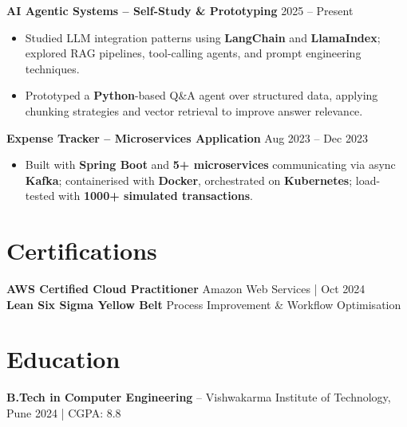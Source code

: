 \documentclass[letterpaper,10pt]{article}
\begin{document}
\textbf{AI Agentic Systems -- Self-Study \& Prototyping} \hfill 2025 -- Present
\begin{itemize}[leftmargin=*]
    \item Studied LLM integration patterns using \textbf{LangChain} and \textbf{LlamaIndex}; explored RAG pipelines, tool-calling agents, and prompt engineering techniques.
    \item Prototyped a \textbf{Python}-based Q\&A agent over structured data, applying chunking strategies and vector retrieval to improve answer relevance.
\end{itemize}

\textbf{Expense Tracker -- Microservices Application} \hfill Aug 2023 -- Dec 2023
\begin{itemize}[leftmargin=*]
    \item Built with \textbf{Spring Boot} and \textbf{5+ microservices} communicating via async \textbf{Kafka}; containerised with \textbf{Docker}, orchestrated on \textbf{Kubernetes}; load-tested with \textbf{1000+ simulated transactions}.
\end{itemize}

\section*{Certifications}
\textbf{AWS Certified Cloud Practitioner} \hfill Amazon Web Services \;|\; Oct 2024 \\
\textbf{Lean Six Sigma Yellow Belt} \hfill Process Improvement \& Workflow Optimisation

\section*{Education}
\textbf{B.Tech in Computer Engineering} -- Vishwakarma Institute of Technology, Pune \hfill 2024 \;|\; CGPA: 8.8
\end{document}
